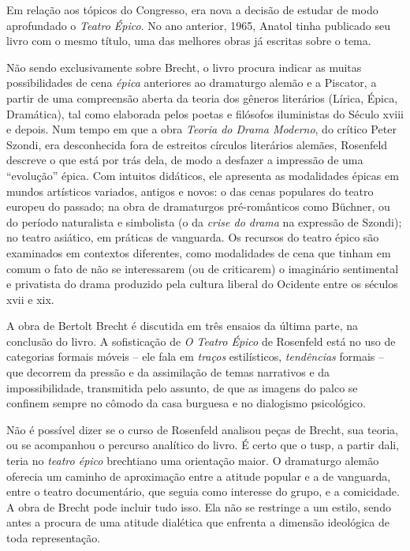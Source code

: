 Em relação aos tópicos do Congresso, era nova a decisão de estudar de
modo aprofundado o {\it Teatro Épico}. No ano anterior, 1965, Anatol
tinha publicado seu livro com o mesmo título, uma das melhores obras já
escritas sobre o tema.

Não sendo exclusivamente sobre Brecht, o livro procura indicar as muitas
possibilidades de cena {\it épica} anteriores ao dramaturgo alemão e a
Piscator, a partir de uma compreensão aberta da teoria dos gêneros
literários (Lírica, Épica, Dramática), tal como elaborada pelos poetas e
filósofos iluministas do Século {\sc xviii} e depois. Num tempo em que a obra
{\it Teoria do Drama Moderno}, do crítico Peter Szondi, era desconhecida
fora de estreitos círculos literários alemães, Rosenfeld descreve o que
está por trás dela, de modo a desfazer a impressão de uma “evolução”
épica. Com intuitos didáticos, ele apresenta as modalidades épicas em
mundos artísticos variados, antigos e novos: o das cenas populares do
teatro europeu do passado; na obra de dramaturgos pré-românticos como
Büchner, ou do período naturalista e simbolista (o da {\it crise do
drama} na expressão de Szondi); no teatro asiático, em práticas de
vanguarda. Os recursos do teatro épico são examinados em contextos
diferentes, como modalidades de cena que tinham em comum o fato de não
se interessarem (ou de criticarem) o imaginário sentimental e privatista
do drama produzido pela cultura liberal do Ocidente entre os séculos
{\sc xvii} e {\sc xix}.

A obra de Bertolt Brecht é discutida em três ensaios da última parte, na
conclusão do livro. A sofisticação de {\it O Teatro Épico} de Rosenfeld
está no uso de categorias formais móveis -- ele fala em {\it traços}
estilísticos, {\it tendências} formais -- que decorrem da pressão e da
assimilação de temas narrativos e da impossibilidade, transmitida pelo
assunto, de que as imagens do palco se confinem sempre no cômodo da casa
burguesa e no dialogismo psicológico.

Não é possível dizer se o curso de Rosenfeld analisou peças de Brecht,
sua teoria, ou se acompanhou o percurso analítico do livro. É certo que
o {\sc tusp}, a partir dali, teria no {\it teatro épico} brechtiano uma
orientação maior. O dramaturgo alemão oferecia um caminho de aproximação
entre a atitude popular e a de vanguarda, entre o teatro documentário,
que seguia como interesse do grupo, e a comicidade. A obra de Brecht
pode incluir tudo isso. Ela não se restringe a um estilo, sendo antes a
procura de uma atitude dialética que enfrenta a dimensão ideológica de
toda representação.

